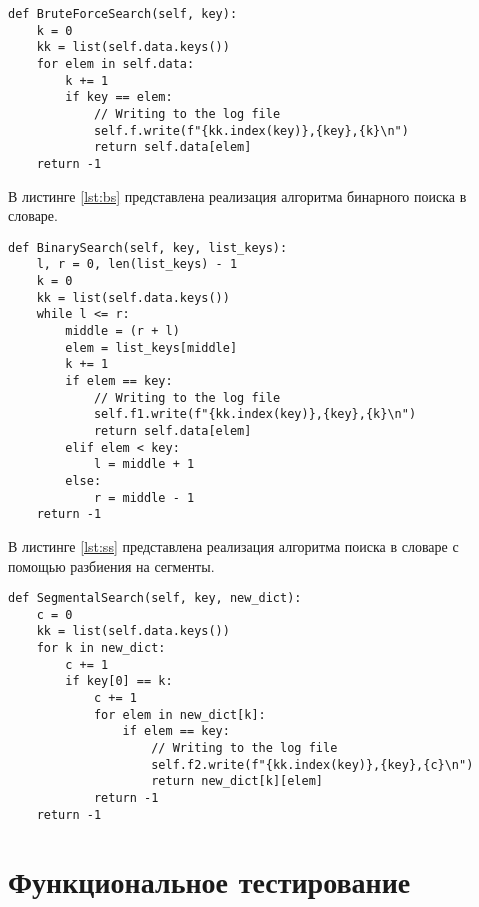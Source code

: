 \begin{center}
	\captionsetup{justification=raggedright,singlelinecheck=off}
	
\begin{lstlisting}[label=lst:bfs,caption=Реализация алгоритма поиска полным перебором]
def BruteForceSearch(self, key):
	k = 0
	kk = list(self.data.keys())
	for elem in self.data:
		k += 1
		if key == elem:
			// Writing to the log file 
			self.f.write(f"{kk.index(key)},{key},{k}\n") 
			return self.data[elem]
	return -1
\end{lstlisting}
\end{center}

В листинге \ref{lst:bs} представлена реализация алгоритма бинарного поиска в словаре.

\begin{center}
	\captionsetup{justification=raggedright,singlelinecheck=off}
\begin{lstlisting}[label=lst:bs,caption=Реализация алгоритма бинарного поиска]
def BinarySearch(self, key, list_keys):
	l, r = 0, len(list_keys) - 1
	k = 0
	kk = list(self.data.keys())
	while l <= r:
		middle = (r + l) 
		elem = list_keys[middle]
		k += 1
		if elem == key:
			// Writing to the log file 
			self.f1.write(f"{kk.index(key)},{key},{k}\n")
			return self.data[elem]
		elif elem < key:
			l = middle + 1
		else:
			r = middle - 1
	return -1
\end{lstlisting}
\end{center}

В листинге \ref{lst:ss} представлена реализация алгоритма поиска в словаре с помощью разбиения на сегменты.

\begin{center}
	\captionsetup{justification=raggedright,singlelinecheck=off}
\begin{lstlisting}[label=lst:ss,caption=Реализация алгоритма поиска в словаре с помощью разбиения на сегменты]
def SegmentalSearch(self, key, new_dict):
	c = 0
	kk = list(self.data.keys())
	for k in new_dict:
		c += 1
		if key[0] == k:
			c += 1
			for elem in new_dict[k]:
				if elem == key:
					// Writing to the log file 
					self.f2.write(f"{kk.index(key)},{key},{c}\n")
					return new_dict[k][elem]
			return -1
	return -1
\end{lstlisting}
\end{center}


\section{Функциональное тестирование}

